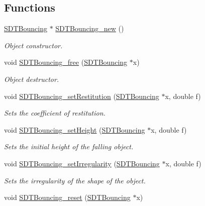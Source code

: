 \subsection*{Functions}
\begin{DoxyCompactItemize}
\item 
\hyperlink{group__bouncing_gaab51e1dac97a045a7e339645c7ef84e8}{S\+D\+T\+Bouncing} $\ast$ \hyperlink{group__bouncing_ga114e29abaede43bdc471c79a657c1fb8}{S\+D\+T\+Bouncing\+\_\+new} ()
\begin{DoxyCompactList}\small\item\em Object constructor. \end{DoxyCompactList}\item 
void \hyperlink{group__bouncing_gabfaffe0eaf93138631e284fe5ed798c7}{S\+D\+T\+Bouncing\+\_\+free} (\hyperlink{group__bouncing_gaab51e1dac97a045a7e339645c7ef84e8}{S\+D\+T\+Bouncing} $\ast$x)
\begin{DoxyCompactList}\small\item\em Object destructor. \end{DoxyCompactList}\item 
void \hyperlink{group__bouncing_ga5165a72d3db90defcceb2b5497278f8c}{S\+D\+T\+Bouncing\+\_\+set\+Restitution} (\hyperlink{group__bouncing_gaab51e1dac97a045a7e339645c7ef84e8}{S\+D\+T\+Bouncing} $\ast$x, double f)
\begin{DoxyCompactList}\small\item\em Sets the coefficient of restitution. \end{DoxyCompactList}\item 
void \hyperlink{group__bouncing_gaf52e4153995574ea3c5f911af0c91ae4}{S\+D\+T\+Bouncing\+\_\+set\+Height} (\hyperlink{group__bouncing_gaab51e1dac97a045a7e339645c7ef84e8}{S\+D\+T\+Bouncing} $\ast$x, double f)
\begin{DoxyCompactList}\small\item\em Sets the initial height of the falling object. \end{DoxyCompactList}\item 
void \hyperlink{group__bouncing_ga2f97eb41d869310dca1422a3ee8ff5ca}{S\+D\+T\+Bouncing\+\_\+set\+Irregularity} (\hyperlink{group__bouncing_gaab51e1dac97a045a7e339645c7ef84e8}{S\+D\+T\+Bouncing} $\ast$x, double f)
\begin{DoxyCompactList}\small\item\em Sets the irregularity of the shape of the object. \end{DoxyCompactList}\item 
\hypertarget{group__bouncing_ga3ecf14685e79e027cda2cfeeab44e6e6}{}void \hyperlink{group__bouncing_ga3ecf14685e79e027cda2cfeeab44e6e6}{S\+D\+T\+Bouncing\+\_\+reset} (\hyperlink{group__bouncing_gaab51e1dac97a045a7e339645c7ef84e8}{S\+D\+T\+Bouncing} $\ast$x)\label{group__bouncing_ga3ecf14685e79e027cda2cfeeab44e6e6}


\end{DoxyCompactItemize}
